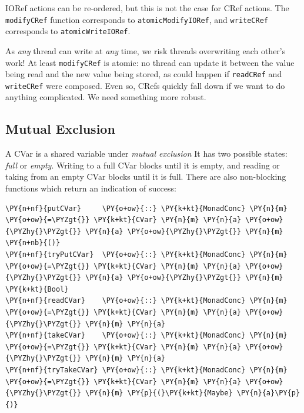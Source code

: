 \begin{departure}
  IORef actions can be re-ordered\cite{ioref}, but this is not the
  case for CRef actions. The \texttt{modifyCRef} function corresponds
  to \texttt{atomicModifyIORef}, and \texttt{writeCRef} corresponds to
  \texttt{atomicWriteIORef}.
\end{departure}

As \textit{any} thread can write at \textit{any} time, we risk threads
overwriting each other's work! At least \texttt{modifyCRef} is atomic:
no thread can update it between the value being read and the new value
being stored, as could happen if \texttt{readCRef} and
\texttt{writeCRef} were composed. Even so, CRefs quickly fall down if
we want to do anything complicated. We need something more robust.

\subsection*{Mutual Exclusion}
\label{sec:dejafu-conc-cvars}

A CVar is a shared variable under \textit{mutual exclusion} It has two
possible states: \textit{full} or \textit{empty}. Writing to a full
CVar blocks until it is empty, and reading or taking from an empty
CVar blocks until it is full. There are also non-blocking functions
which return an indication of success:


\begin{Verbatim}[commandchars=\\\{\}]
\PY{n+nf}{putCVar}     \PY{o+ow}{::} \PY{k+kt}{MonadConc} \PY{n}{m} \PY{o+ow}{=\PYZgt{}} \PY{k+kt}{CVar} \PY{n}{m} \PY{n}{a} \PY{o+ow}{\PYZhy{}\PYZgt{}} \PY{n}{a} \PY{o+ow}{\PYZhy{}\PYZgt{}} \PY{n}{m} \PY{n+nb}{()}
\PY{n+nf}{tryPutCVar}  \PY{o+ow}{::} \PY{k+kt}{MonadConc} \PY{n}{m} \PY{o+ow}{=\PYZgt{}} \PY{k+kt}{CVar} \PY{n}{m} \PY{n}{a} \PY{o+ow}{\PYZhy{}\PYZgt{}} \PY{n}{a} \PY{o+ow}{\PYZhy{}\PYZgt{}} \PY{n}{m} \PY{k+kt}{Bool}
\PY{n+nf}{readCVar}    \PY{o+ow}{::} \PY{k+kt}{MonadConc} \PY{n}{m} \PY{o+ow}{=\PYZgt{}} \PY{k+kt}{CVar} \PY{n}{m} \PY{n}{a} \PY{o+ow}{\PYZhy{}\PYZgt{}} \PY{n}{m} \PY{n}{a}
\PY{n+nf}{takeCVar}    \PY{o+ow}{::} \PY{k+kt}{MonadConc} \PY{n}{m} \PY{o+ow}{=\PYZgt{}} \PY{k+kt}{CVar} \PY{n}{m} \PY{n}{a} \PY{o+ow}{\PYZhy{}\PYZgt{}} \PY{n}{m} \PY{n}{a}
\PY{n+nf}{tryTakeCVar} \PY{o+ow}{::} \PY{k+kt}{MonadConc} \PY{n}{m} \PY{o+ow}{=\PYZgt{}} \PY{k+kt}{CVar} \PY{n}{m} \PY{n}{a} \PY{o+ow}{\PYZhy{}\PYZgt{}} \PY{n}{m} \PY{p}{(}\PY{k+kt}{Maybe} \PY{n}{a}\PY{p}{)}
\end{Verbatim}

